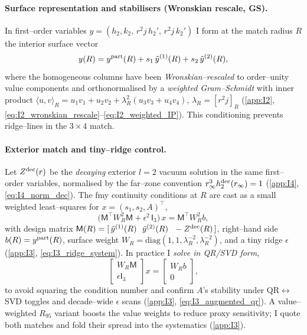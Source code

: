\documentclass{iopjournal}
\begin{document}
\paragraph{Surface representation and stabilisers (Wronskian rescale, GS).}
In first–order variables \(y=(h_2,k_2,\,r^{2}j\,h_2',\,r^{2}j\,k_2')\) I form at the match radius \(R\) the interior surface vector
\begin{equation}
y(R)=y^{\rm part}(R)+s_1\,\tilde y^{(1)}(R)+s_2\,\tilde y^{(2)}(R),
\label{eq:12_surface_int}
\end{equation}
where the homogeneous columns have been \emph{Wronskian–rescaled} to order–unity value components and orthonormalised by a \emph{weighted Gram–Schmidt} with inner product \(\langle u,v\rangle_R=u_1v_1+u_2v_2+\lambda_R^{2}(u_3v_3+u_4v_4)\), \(\lambda_R=[r^{2}j]_{R}\) (\cref{app:I2}, \eqref{eq:I2_wronskian_rescale}–\eqref{eq:I2_weighted_IP}). This conditioning prevents ridge–lines in the $3\times4$ match.

\paragraph{Exterior match and tiny–ridge control.}
Let \(Z^{\rm dec}(r)\) be the \emph{decaying} exterior $l=2$ vacuum solution in the same first–order variables, normalised by the far–zone convention \(r_\infty^{3}h_2^{\rm dec}(r_\infty)=1\) (\cref{app:I4}, \eqref{eq:I4_norm_dec}). The fmy continuity conditions at \(R\) are cast as a small weighted least–squares for \(x=(s_1,s_2,A)^{\top}\),
\begin{equation}
\big(\mathsf M^\top W_R^{2}\mathsf M+\epsilon^2\,\mathsf I_3\big)\,x=\mathsf M^\top W_R^{2}b,
\label{eq:12_normal_eq}
\end{equation}
with design matrix \(\mathsf M(R)=[\,\tilde y^{(1)}(R)\ \ \tilde y^{(2)}(R)\ \ -Z^{\rm dec}(R)\,]\), right–hand side \(b(R)=y^{\rm part}(R)\), surface weight \(W_R=\mathrm{diag}(1,1,\lambda_R^{-2},\lambda_R^{-2})\), and a tiny ridge \(\epsilon\) (\cref{app:I3}, \eqref{eq:I3_ridge_system}). In practice I \emph{solve in QR/SVD form},
\begin{equation}
\begin{bmatrix}W_R\mathsf M\\ \epsilon\mathsf I_3\end{bmatrix}x
=\begin{bmatrix}W_R b\\ 0\end{bmatrix},
\label{eq:12_qr}
\end{equation}
to avoid squaring the condition number and confirm \(A\)’s stability under QR\(\leftrightarrow\)SVD toggles and decade–wide \(\epsilon\) scans (\cref{app:I3}, \eqref{eq:I3_augmented_qr}). A value–weighted \emph{$R_{95}$} variant boosts the value weights to reduce proxy sensitivity; I quote both matches and fold their spread into the systematics (\cref{app:I3}).
\end{document}
